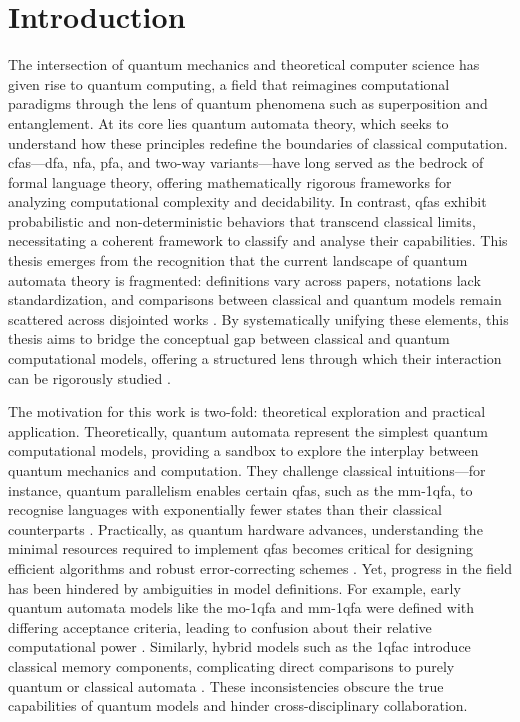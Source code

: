 \chapter{Introduction}  
\label{chap:introduction}

The intersection of quantum mechanics and theoretical computer science has given rise to quantum computing, a field that reimagines computational paradigms through the lens of quantum phenomena such as superposition and entanglement. At its core lies quantum automata theory, which seeks to understand how these principles redefine the boundaries of classical computation. \glspl{cfa}—\gls{dfa}, \gls{nfa}, \gls{pfa}, and two-way variants—have long served as the bedrock of formal language theory, offering mathematically rigorous frameworks for analyzing computational complexity and decidability. In contrast, \glspl{qfa} exhibit probabilistic and non-deterministic behaviors that transcend classical limits, necessitating a coherent framework to classify and analyse their capabilities. This thesis emerges from the recognition that the current landscape of quantum automata theory is fragmented: definitions vary across papers, notations lack standardization, and comparisons between classical and quantum models remain scattered across disjointed works \cite{gruska2012quantum}. By systematically unifying these elements, this thesis aims to bridge the conceptual gap between classical and quantum computational models, offering a structured lens through which their interaction can be rigorously studied \cite{ambainis2009superiority}.  

The motivation for this work is two-fold: theoretical exploration and practical application. Theoretically, quantum automata represent the simplest quantum computational models, providing a sandbox to explore the interplay between quantum mechanics and computation. They challenge classical intuitions—for instance, quantum parallelism enables certain \glspl{qfa}, such as the \gls{mm-1qfa}, to recognise languages with exponentially fewer states than their classical counterparts \cite{ambainis1998one}. Practically, as quantum hardware advances, understanding the minimal resources required to implement \glspl{qfa} becomes critical for designing efficient algorithms and robust error-correcting schemes \cite{nielsen2010quantum}. Yet, progress in the field has been hindered by ambiguities in model definitions. For example, early quantum automata models like the \gls{mo-1qfa} and \gls{mm-1qfa} were defined with differing acceptance criteria, leading to confusion about their relative computational power \cite{kondacs1997power}. Similarly, hybrid models such as the \gls{1qfac} introduce classical memory components, complicating direct comparisons to purely quantum or classical automata \cite{li2012characterizations}. These inconsistencies obscure the true capabilities of quantum models and hinder cross-disciplinary collaboration.

